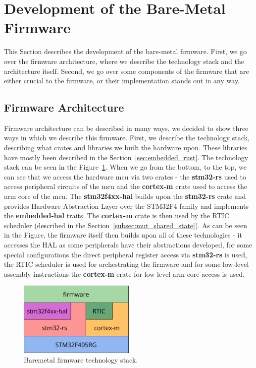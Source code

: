 \section{Development of the Bare-Metal Firmware}
\label{sec:firmware}
This Section describes the development of the bare-metal firmware.
First, we go over the firmware architecture, where we describe the technology stack and the architecture itself.
Second, we go over some components of the firmware that are either crucial to the firmware, or their implementation stands out in any way.

\subsection{Firmware Architecture}
\label{subsec:firmware-arch}
Firmware architecture can be described in many ways, we decided to show three ways in which we describe this firmware.
First, we describe the technology stack, describing what crates and libraries we built the hardware upon.
These libraries have mostly been described in the Section~\ref{sec:embedded_rust}.
The technology stack can be seen in the Figure~\ref{fig:firmware_tech_stack}.
When we go from the bottom, to the top, we can see that we access the hardware \acs{mcu} via two crates - the \textbf{stm32-rs} used to access peripheral circuits of the \acs{mcu} and the \textbf{cortex-m} crate used to access the \acs{arm} core of the \acs{mcu}.
The \textbf{stm32f4xx-hal} builds upon the \textbf{stm32-rs} crate and provides Hardware Abstraction Layer over the STM32F4 family and implements the \textbf{embedded-hal} traits.
The \textbf{cortex-m} crate is then used by the RTIC scheduler (described in the Section~\ref{subsec:mut_shared_state}).
As can be seen in the Figure, the firmware itself then builds upon all of these technologies - it accesses the HAL as some peripherals have their abstractions developed, for some special configurations the direct peripheral register access via \textbf{stm32-rs} is used, the RTIC scheduler is used for orchestrating the firmware and for some low-level assembly instructions the \textbf{cortex-m} crate for low level \acs{arm} core access is used.

\begin{figure}[H]
    \centering
    \includegraphics[width=0.5\textwidth]{obrazky/tech_stack}
    \caption{Bare\textendash metal firmware technology stack.}
    \label{fig:firmware_tech_stack}
\end{figure}

